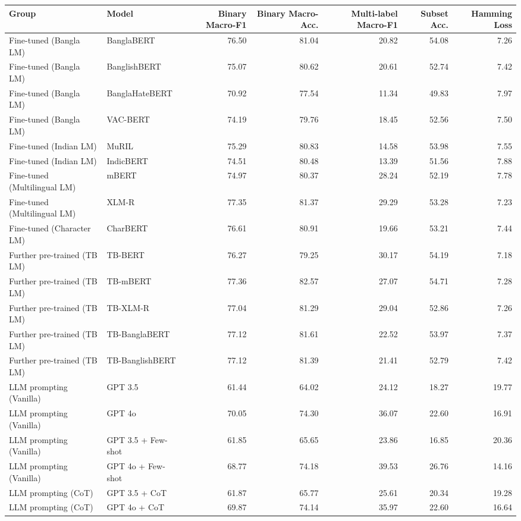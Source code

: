 \begin{tabular}{llrrrrr}
\toprule
Group & Model & Binary Macro-F1 & Binary Macro-Acc. & Multi-label Macro-F1 & Subset Acc. & Hamming Loss \\
\midrule
Fine-tuned (Bangla LM) & BanglaBERT & 76.50 & 81.04 & 20.82 & 54.08 & 7.26 \\
Fine-tuned (Bangla LM) & BanglishBERT & 75.07 & 80.62 & 20.61 & 52.74 & 7.42 \\
Fine-tuned (Bangla LM) & BanglaHateBERT & 70.92 & 77.54 & 11.34 & 49.83 & 7.97 \\
Fine-tuned (Bangla LM) & VAC-BERT & 74.19 & 79.76 & 18.45 & 52.56 & 7.50 \\
Fine-tuned (Indian LM) & MuRIL & 75.29 & 80.83 & 14.58 & 53.98 & 7.55 \\
Fine-tuned (Indian LM) & IndicBERT & 74.51 & 80.48 & 13.39 & 51.56 & 7.88 \\
Fine-tuned (Multilingual LM) & mBERT & 74.97 & 80.37 & 28.24 & 52.19 & 7.78 \\
Fine-tuned (Multilingual LM) & XLM-R & 77.35 & 81.37 & 29.29 & 53.28 & 7.23 \\
Fine-tuned (Character LM) & CharBERT & 76.61 & 80.91 & 19.66 & 53.21 & 7.44 \\
Further pre-trained (TB LM) & TB-BERT & 76.27 & 79.25 & 30.17 & 54.19 & 7.18 \\
Further pre-trained (TB LM) & TB-mBERT & 77.36 & 82.57 & 27.07 & 54.71 & 7.28 \\
Further pre-trained (TB LM) & TB-XLM-R & 77.04 & 81.29 & 29.04 & 52.86 & 7.26 \\
Further pre-trained (TB LM) & TB-BanglaBERT & 77.12 & 81.61 & 22.52 & 53.97 & 7.37 \\
Further pre-trained (TB LM) & TB-BanglishBERT & 77.12 & 81.39 & 21.41 & 52.79 & 7.42 \\
LLM prompting (Vanilla) & GPT 3.5 & 61.44 & 64.02 & 24.12 & 18.27 & 19.77 \\
LLM prompting (Vanilla) & GPT 4o & 70.05 & 74.30 & 36.07 & 22.60 & 16.91 \\
LLM prompting (Vanilla) & GPT 3.5 + Few-shot & 61.85 & 65.65 & 23.86 & 16.85 & 20.36 \\
LLM prompting (Vanilla) & GPT 4o + Few-shot & 68.77 & 74.18 & 39.53 & 26.76 & 14.16 \\
LLM prompting (CoT) & GPT 3.5 + CoT & 61.87 & 65.77 & 25.61 & 20.34 & 19.28 \\
LLM prompting (CoT) & GPT 4o + CoT & 69.87 & 74.14 & 35.97 & 22.60 & 16.64 \\

\end{tabular}
